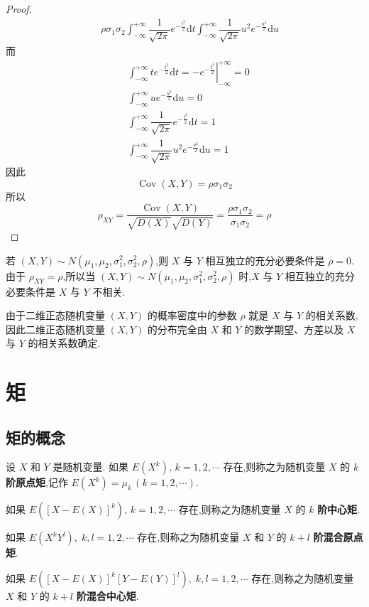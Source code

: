 \begin{proof}
$$\begin{aligned}
        & \; \rho \sigma_1 \sigma_2 \int_{-\infty}^{+\infty} \dfrac{1}{\sqrt{2 \pi}} e^{-\frac{t^2}{2}} \text{d}t \int_{-\infty}^{+\infty} \dfrac{1}{\sqrt{2 \pi}} u^2 e^{-\frac{u^2}{2}} \text{d}u
    \end{aligned}
    $$
    而
    $$
    \begin{aligned}
        & \int_{-\infty}^{+\infty} t e^{-\frac{t^2}{2}} \text{d}t = \left. -e^{-\frac{t^2}{2}} \right|_{-\infty}^{+\infty} = 0 \\
        & \int_{-\infty}^{+\infty} u e^{-\frac{u^2}{2}} \text{d}u = 0 \\
        & \int_{-\infty}^{+\infty} \dfrac{1}{\sqrt{2 \pi}} e^{-\frac{t^2}{2}} \text{d}t = 1 \\
        & \int_{-\infty}^{+\infty} \dfrac{1}{\sqrt{2 \pi}} u^2 e^{-\frac{u^2}{2}} \text{d}u = 1
    \end{aligned}
    $$
    因此
    $$
    \operatorname{Cov}(X,Y) = \rho \sigma_1 \sigma_2
    $$
    所以
    $$
    \rho_{XY} = \dfrac{\operatorname{Cov}(X,Y)}{\sqrt{D(X)} \sqrt{D(Y)}} = \dfrac{\rho \sigma_1 \sigma_2}{\sigma_1 \sigma_2} = \rho
    $$
\end{proof}

若 $(X,Y) \sim N(\mu_1,\mu_2,\sigma_1^2,\sigma_2^2,\rho)$,则 $X$ 与 $Y$ 相互独立的充分必要条件是 $\rho=0$. 由于 $\rho_{XY} = \rho$,所以当 $(X,Y) \sim N(\mu_1,\mu_2,\sigma_1^2,\sigma_2^2,\rho)$ 时,$X$ 与 $Y$ 相互独立的充分必要条件是 $X$ 与 $Y$ 不相关.

由于二维正态随机变量 $(X,Y)$ 的概率密度中的参数 $\rho$ 就是 $X$ 与 $Y$ 的相关系数,因此二维正态随机变量 $(X,Y)$ 的分布完全由 $X$ 和 $Y$ 的数学期望、方差以及 $X$ 与 $Y$ 的相关系数确定.

\section{矩}

\subsection{矩的概念}

\begin{definition}
    设 $X$ 和 $Y$ 是随机变量. 如果 $E(X^k), \, k=1,2,\cdots$ 存在,则称之为随机变量 $X$ 的 $k$ \textbf{阶原点矩},记作 $E(X^k) = \mu_k \, (k=1,2,\cdots)$.

    如果 $E([X-E(X)]^k), \, k=1,2,\cdots$ 存在,则称之为随机变量 $X$ 的 $k$ \textbf{阶中心矩}.

    如果 $E(X^k Y^l), \; k,l=1,2,\cdots$ 存在,则称之为随机变量 $X$ 和 $Y$ 的 $k+l$ \textbf{阶混合原点矩}.

    如果 $E([X-E(X)]^k [Y-E(Y)]^l), \; k,l=1,2,\cdots$ 存在,则称之为随机变量 $X$ 和 $Y$ 的 $k+l$ \textbf{阶混合中心矩}.
\end{definition}

